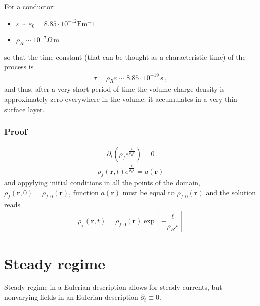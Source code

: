 \documentclass[letterpaper,10pt,english]{jupyterBook}
\begin{document}
\sphinxAtStartPar
For a conductor:
\begin{itemize}
\item {} 
\sphinxAtStartPar
\(\varepsilon \sim \varepsilon_0 = 8.85 \cdot 10^{-12} \text{F} \text{m}^-1\)

\item {} 
\sphinxAtStartPar
\(\rho_R \sim 10^{-7}  \Omega \, \text{m}\)

\end{itemize}

\sphinxAtStartPar
so that the time constant (that can be thought as a characteristic time) of the process is
\begin{equation*}
\begin{split}\tau = \rho_R \varepsilon \sim 8.85 \cdot 10^{-19} \, \text{s} \ , \end{split}
\end{equation*}
\sphinxAtStartPar
and thus, after a very short period of time the volume charge density is approximately zero everywhere in the volume: it accumulates in a very thin surface layer.
\subsubsection*{Proof}
\begin{equation*}
\begin{split}\partial_t \left( \rho_f e^{\frac{t}{\rho_R \varepsilon}} \right) = 0\end{split}
\end{equation*}\begin{equation*}
\begin{split}\rho_f(\mathbf{r},t) e^{\frac{r}{\rho_R \varepsilon}} = a(\mathbf{r})\end{split}
\end{equation*}
\sphinxAtStartPar
and appylying initial conditions in all the points of the domain, \(\rho_{f}(\mathbf{r},0) = \rho_{f,0}(\mathbf{r})\), function \(a(\mathbf{r})\) must be equal to \(\rho_{f,0}(\mathbf{r})\) and the solution reads
\begin{equation*}
\begin{split}\rho_f(\mathbf{r},t) = \rho_{f,0}(\mathbf{r}) \exp \left[ -\dfrac{t}{\rho_R \varepsilon} \right]\end{split}
\end{equation*}
\sphinxstepscope


\section{Steady regime}
\label{\detokenize{ch/regimes-steady:steady-regime}}\label{\detokenize{ch/regimes-steady:classical-electromagnetism-regimes-steady}}\label{\detokenize{ch/regimes-steady::doc}}
\sphinxAtStartPar
Steady regime \sphinxhyphen{} in a Eulerian description \sphinxhyphen{} allows for steady currents, but non\sphinxhyphen{}varying fields in an Eulerian description \(\partial_t \equiv 0\).
\end{document}
